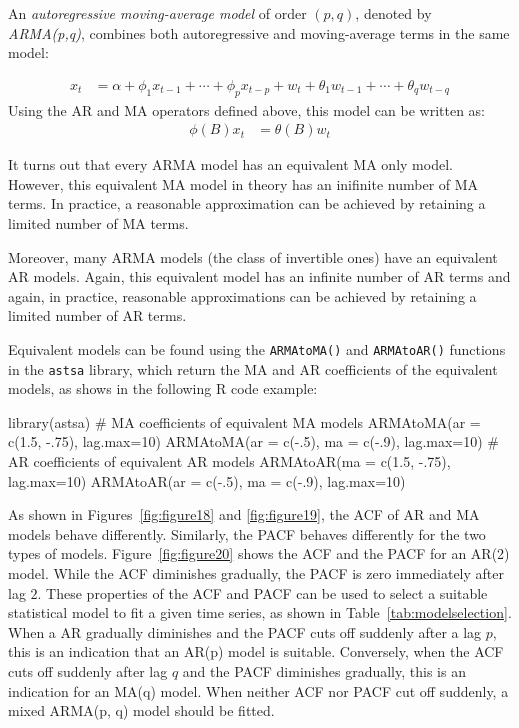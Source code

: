 An \emph{autoregressive moving-average model} of order $(p, q)$, denoted by \emph{ARMA(p,q)}, combines both autoregressive and moving-average terms in the same model:

\begin{align*}
x_t &= \alpha + \phi_1 x_{t-1} + \cdots + \phi_p x_{t-p} + w_t + \theta_1 w_{t-1} + \cdots + \theta_q w_{t-q} 
\end{align*}
\noindent Using the AR and MA operators defined above, this model can be written as:
\begin{align*}
\phi(B) x_t &= \theta (B) w_t 
\end{align*}

It turns out that every ARMA model has an equivalent MA only model. However, this equivalent MA model in theory has an inifinite number of MA terms. In practice, a reasonable approximation can be achieved by retaining a limited number of MA terms.

Moreover, many ARMA models (the class of invertible ones) have an equivalent AR models. Again, this equivalent model has an infinite number of AR terms and again, in practice, reasonable approximations can be achieved by retaining a limited number of AR terms.

Equivalent models can be found using the \texttt{ARMAtoMA()} and \texttt{ARMAtoAR()} functions in the \texttt{astsa} library, which return the MA and AR coefficients of the equivalent models, as shows in the following R code example:

\begin{samepage}
\begin{Rcode}
library(astsa)
# MA coefficients of equivalent MA models
ARMAtoMA(ar = c(1.5, -.75), lag.max=10)
ARMAtoMA(ar = c(-.5), ma = c(-.9), lag.max=10)
# AR coefficients of equivalent AR models
ARMAtoAR(ma = c(1.5, -.75), lag.max=10)
ARMAtoAR(ar = c(-.5), ma = c(-.9), lag.max=10)
\end{Rcode}
\end{samepage}

As shown in Figures~\ref{fig:figure18} and \ref{fig:figure19}, the ACF of AR and MA models behave differently. Similarly, the PACF behaves differently for the two types of models. Figure~\ref{fig:figure20} shows the ACF and the PACF for an AR(2) model. While the ACF diminishes gradually, the PACF is zero immediately after lag $2$. These properties of the ACF and PACF can be used to select a suitable statistical model to fit a given time series, as shown in Table~\ref{tab:modelselection}. When a AR gradually diminishes and the PACF cuts off suddenly after a lag $p$, this is an indication that an AR(p) model is suitable. Conversely, when the ACF cuts off suddenly after lag $q$ and the PACF diminishes gradually, this is an indication for an MA(q) model. When neither ACF nor PACF cut off suddenly, a mixed ARMA(p, q) model should be fitted.


